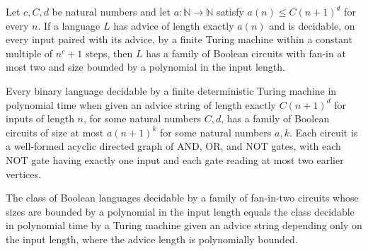 \begin{theorem}
\label{Complexity.mem_PPoly_of_mem_DTIMEAdvice}
\leanok
{}
Let $c,C,d$ be natural numbers and let $a:\mathbb N\to\mathbb N$ satisfy $a(n)\le
C(n+1)^d$ for every $n$. If a language $L$ has advice of length exactly $a(n)$ and is
decidable, on every input paired with its advice, by a finite Turing machine within a
constant multiple of $n^c+1$ steps, then $L$ has a family of Boolean circuits with
fan-in at most two and size bounded by a polynomial in the input length.
\end{theorem}

\begin{theorem}
\label{Complexity.PAdvicePoly_subset_PPoly}
\leanok
{}
Every binary language decidable by a finite deterministic Turing machine in polynomial
time when given an advice string of length exactly $C(n+1)^d$ for inputs of length $n$,
for some natural numbers $C,d$, has a family of Boolean circuits of size at most
$a(n+1)^k$ for some natural numbers $a,k$. Each circuit is a well-formed acyclic
directed graph of AND, OR, and NOT gates, with each NOT gate having exactly one input
and each gate reading at most two earlier vertices.
\end{theorem}

\begin{theorem}
\label{Complexity.PPoly_eq_PAdvicePoly}
\leanok
{}
The class of Boolean languages decidable by a family of fan-in-two circuits whose sizes
are bounded by a polynomial in the input length equals the class decidable in polynomial
time by a Turing machine given an advice string depending only on the input length,
where the advice length is polynomially bounded.
\end{theorem}

